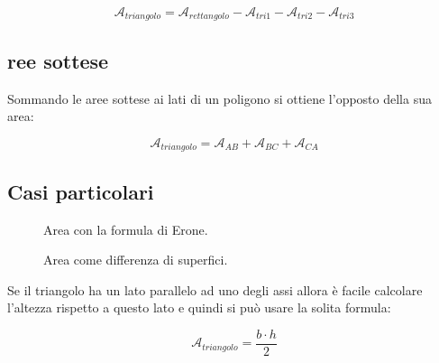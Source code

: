 \[\mathcal{A}_{triangolo} = \mathcal{A}_{rettangolo}-\mathcal{A}_{tri1}
                                                    -\mathcal{A}_{tri2}
                                                    -\mathcal{A}_{tri3}\]

\subsection*{ree sottese}
Sommando le aree sottese ai lati di un poligono si ottiene l'opposto della 
sua area:

\[\mathcal{A}_{triangolo} = \mathcal{A}_{AB} + 
                            \mathcal{A}_{BC} +
                            \mathcal{A}_{CA}\]

\subsection*{Casi particolari}

\begin{inaccessibleblock}
 \begin{figure}[h]
 \centering
 \begin{minipage}[t]{.45\textwidth}
  \centering \triangoloparallelox
  \caption{Area con la formula di Erone.}\label{fig:triangoloparallelox}
 \end{minipage}\hfil
 \begin{minipage}[t]{.45\textwidth}
    \centering \triangoloparalleloy
  \caption{Area come differenza di superfici.}\label{fig:triangoloparalleloy}
 \end{minipage}\hfil
\end{figure}
\end{inaccessibleblock}

Se il triangolo ha un lato parallelo ad uno degli assi allora è facile 
calcolare l'altezza rispetto a questo lato e quindi si può usare la 
solita formula:

\[\mathcal{A}_{triangolo} = \frac{b \cdot h}{2}\]

